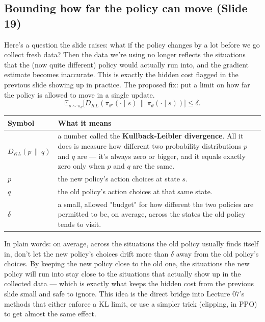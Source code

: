 \documentclass[11pt]{article}
\begin{document}
\subsection{Bounding how far the policy can move (Slide 19)}
Here's a question the slide raises: what if the policy changes by a lot before we go collect fresh data? Then the data we're using no longer reflects the situations that the (now quite different) policy would actually run into, and the gradient estimate becomes inaccurate. This is exactly the hidden cost flagged in the previous slide showing up in practice. The proposed fix: put a limit on how far the policy is allowed to move in a single update.
$$\mathbb{E}_{s\sim\pi_\theta}\big[D_{KL}(\pi_{\theta'}(\cdot\mid s)\,\|\,\pi_\theta(\cdot\mid s))\big] \le \delta.$$
\begin{center}
\begin{tabular}{@{} >{\raggedright\arraybackslash}p{} >{\raggedright\arraybackslash}p{} @{}}
\toprule
\textbf{Symbol} & \textbf{What it means} \\
\midrule
$D_{KL}(p\,\|\,q)$ & a number called the \textbf{Kullback-Leibler divergence}. All it does is measure how different two probability distributions $p$ and $q$ are --- it's always zero or bigger, and it equals exactly zero only when $p$ and $q$ are the same. \\
$p$ & the new policy's action choices at state $s$. \\
$q$ & the old policy's action choices at that same state. \\
$\delta$ & a small, allowed "budget" for how different the two policies are permitted to be, on average, across the states the old policy tends to visit. \\
\bottomrule
\end{tabular}
\end{center}

In plain words: on average, across the situations the old policy usually finds itself in, don't let the new policy's choices drift more than $\delta$ away from the old policy's choices. By keeping the new policy close to the old one, the situations the new policy will run into stay close to the situations that actually show up in the collected data --- which is exactly what keeps the hidden cost from the previous slide small and safe to ignore. This idea is the direct bridge into Lecture 07's methods that either enforce a KL limit, or use a simpler trick (clipping, in PPO) to get almost the same effect.
\end{document}
